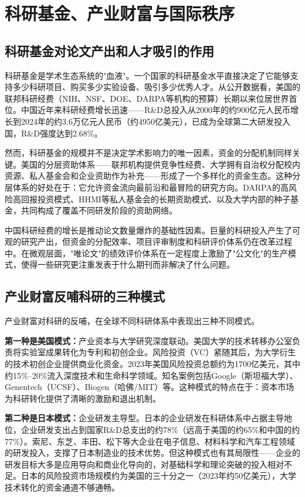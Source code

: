 \section{科研基金、产业财富与国际秩序}

\subsection{科研基金对论文产出和人才吸引的作用}

\noindent 科研基金是学术生态系统的"血液"。一个国家的科研基金水平直接决定了它能够支持多少科研项目、购买多少实验设备、吸引多少优秀人才。从公开数据看，美国的联邦科研经费（NIH、NSF、DOE、DARPA等机构的预算）长期以来位居世界首位。中国近年来科研经费增长迅速——R\&D总投入从2000年的约900亿元人民币增长到2024年的约3.6万亿元人民币（约4950亿美元），已成为全球第二大研发投入国，R\&D强度达到2.68\%\cite{NBS2025}。

然而，科研基金的规模并不是决定学术影响力的唯一因素，资金的分配机制同样关键。美国的分层资助体系——联邦机构提供竞争性经费、大学拥有自治权分配校内资源、私人基金会和企业资助作为补充——形成了一个多样化的资金生态。这种分层体系的好处在于：它允许资金流向最前沿和最冒险的研究方向。DARPA的高风险高回报投资模式、HHMI等私人基金会的长期资助模式、以及大学内部的种子基金，共同构成了覆盖不同研发阶段的资助网络。

中国科研经费的增长是推动论文数量爆炸的基础性因素。巨量的科研投入产生了可观的研究产出，但资金的分配效率、项目评审制度和科研评价体系仍在改革过程中。在微观层面，"唯论文"的绩效评价体系在一定程度上激励了"公文化"的生产模式，使得一些研究更注重发表于什么期刊而非解决了什么问题。

\subsection{产业财富反哺科研的三种模式}

产业财富对科研的反哺，在全球不同科研体系中表现出三种不同模式。

\textbf{第一种是美国模式：}产业资本与大学研究深度联动。美国大学的技术转移办公室负责将实验室成果转化为专利和初创企业。风险投资（VC）紧随其后，为大学衍生的技术初创企业提供商业化资金。2023年美国风险投资总额约为1700亿美元，其中约15\%--20\%流入深度技术和生命科学领域。知名案例包括Google（斯坦福大学）、Genentech（UCSF）、Biogen（哈佛/MIT）等。这种模式的特点在于：资本市场为科研转化提供了清晰的激励和退出机制。

\textbf{第二种是日本模式：}企业研发主导型。日本的企业研发在科研体系中占据主导地位，企业研发支出占到国家R\&D总支出的约78\%（远高于美国的约65\%和中国的约77\%）。索尼、东芝、丰田、松下等大企业在电子信息、材料科学和汽车工程领域的研发投入，支撑了日本制造业的技术优势。但这种模式也有其局限性——企业的研发目标大多是应用导向和商业化导向的，对基础科学和理论突破的投入相对不足。日本的风险投资市场规模约为美国的三十分之一（2023年约50亿美元），大学技术转化的资金通道不够通畅。

